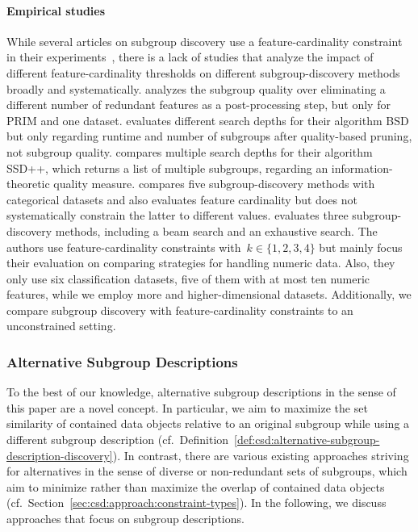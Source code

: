 \documentclass{article}
\theoremstyle{definition}
\begin{document}
\paragraph{Empirical studies}

While several articles on subgroup discovery use a feature-cardinality constraint in their experiments~\cite{arzamasov2022pedagogical, mampaey2012efficient, lavrac2006relevancy, leeuwen2012diverse, leeuwen2013discovering}, there is a lack of studies that analyze the impact of different feature-cardinality thresholds on different subgroup-discovery methods broadly and systematically.
\cite{friedman1999bump} analyzes the subgroup quality over eliminating a different number of redundant features as a post-processing step, but only for PRIM and one dataset.
\cite{lemmerich2010fast} evaluates different search depths for their algorithm BSD but only regarding runtime and number of subgroups after quality-based pruning, not subgroup quality.
\cite{proencca2022robust} compares multiple search depths for their algorithm SSD++, which returns a list of multiple subgroups, regarding an information-theoretic quality measure.
\cite{helal2016subgroup} compares five subgroup-discovery methods with categorical datasets and also evaluates feature cardinality but does not systematically constrain the latter to different values.
\cite{meeng2021real} evaluates three subgroup-discovery methods, including a beam search and an exhaustive search.
The authors use feature-cardinality constraints with~$k \in \{1, 2, 3, 4\}$ but mainly focus their evaluation on comparing strategies for handling numeric data.
Also, they only use six classification datasets, five of them with at most ten numeric features, while we employ more and higher-dimensional datasets.
Additionally, we compare subgroup discovery with feature-cardinality constraints to an unconstrained setting.

\subsubsection{Alternative Subgroup Descriptions}
\label{sec:csd:related-work:subgroup-discovery:alternatives}

To the best of our knowledge, alternative subgroup descriptions in the sense of this paper are a novel concept.
In particular, we aim to maximize the set similarity of contained data objects relative to an original subgroup while using a different subgroup description (cf.~Definition~\ref{def:csd:alternative-subgroup-description-discovery}).
In contrast, there are various existing approaches striving for alternatives in the sense of diverse or non-redundant sets of subgroups, which aim to minimize rather than maximize the overlap of contained data objects~\cite{atzmueller2015subgroup} (cf.~Section~\ref{sec:csd:approach:constraint-types}).
In the following, we discuss approaches that focus on subgroup descriptions.
\end{document}

